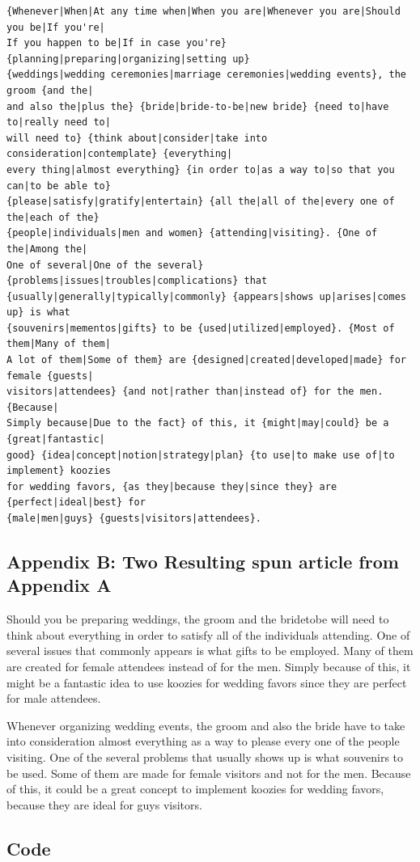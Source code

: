 \documentclass[11pt,letterpaper,oneside, titlepage]{scrartcl}
\begin{document}
\begin{verbatim}{Whenever|When|At any time when|When you are|Whenever you are|Should you be|If you're|
If you happen to be|If in case you're} {planning|preparing|organizing|setting up} 
{weddings|wedding ceremonies|marriage ceremonies|wedding events}, the groom {and the|
and also the|plus the} {bride|bride-to-be|new bride} {need to|have to|really need to|
will need to} {think about|consider|take into consideration|contemplate} {everything|
every thing|almost everything} {in order to|as a way to|so that you can|to be able to}
{please|satisfy|gratify|entertain} {all the|all of the|every one of the|each of the}
{people|individuals|men and women} {attending|visiting}. {One of the|Among the|
One of several|One of the several} {problems|issues|troubles|complications} that 
{usually|generally|typically|commonly} {appears|shows up|arises|comes up} is what 
{souvenirs|mementos|gifts} to be {used|utilized|employed}. {Most of them|Many of them|
A lot of them|Some of them} are {designed|created|developed|made} for female {guests|
visitors|attendees} {and not|rather than|instead of} for the men. {Because|
Simply because|Due to the fact} of this, it {might|may|could} be a {great|fantastic|
good} {idea|concept|notion|strategy|plan} {to use|to make use of|to implement} koozies
for wedding favors, {as they|because they|since they} are {perfect|ideal|best} for 
{male|men|guys} {guests|visitors|attendees}.
\end{verbatim}
 
\subsection{Appendix B: Two Resulting spun article from Appendix A}


Should you be preparing weddings, the groom and the bridetobe will need to think about everything in order to satisfy all of the individuals attending. One of several issues that commonly appears is what gifts to be employed. Many of them are created for female attendees instead of for the men. Simply because of this, it might be a fantastic idea to use koozies for wedding favors since they are perfect for male attendees.

 
Whenever organizing wedding events, the groom and also the bride have to take into consideration almost everything as a way to please every one of the people visiting. One of the several problems that usually shows up is what souvenirs to be used. Some of them are made for female visitors and not for the men. Because of this, it could be a great concept to implement koozies for wedding favors, because they are ideal for guys visitors.




\clearpage

\subsection{Code}

\begin{lstlisting}

\end{lstlisting}
\end{document}
